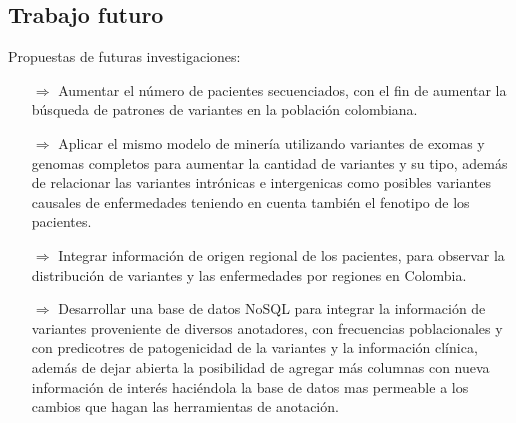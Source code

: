\subsection{Trabajo futuro}

Propuestas de futuras investigaciones:

\begin{itemize}
	\item[$\Rightarrow$] Aumentar el número de pacientes secuenciados, con el fin de aumentar la búsqueda de patrones de variantes en la población colombiana.
	
	\item[$\Rightarrow$] Aplicar el mismo modelo de minería utilizando variantes de exomas  y genomas completos para aumentar la cantidad de variantes y su tipo, además de relacionar las variantes intrónicas e intergenicas como posibles variantes causales de enfermedades teniendo en cuenta también el fenotipo de los pacientes.
	
	\item[$\Rightarrow$] Integrar información de origen regional de los pacientes, para observar la distribución de variantes  y las enfermedades por regiones en Colombia.
	
	\item[$\Rightarrow$] Desarrollar una base de datos NoSQL para integrar la información de variantes proveniente de diversos anotadores, con frecuencias poblacionales y con predicotres de patogenicidad de la variantes y la información clínica, además de dejar abierta la posibilidad de agregar más columnas con nueva información de interés haciéndola la base de datos mas permeable a los cambios que hagan las herramientas de anotación. 

\end{itemize}
